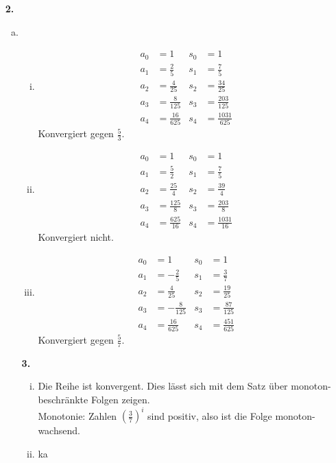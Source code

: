 \documentclass[a4paper]{scrartcl}
\begin{document}
\begin{enumerate}
\item[\textbf{2.}]
\begin{enumerate}[a)]
\item
\begin{enumerate}[(i)]
\item
\begin{align}
a_0 &= 1                & s_0 &= 1 \\
a_1 &= \frac 2 5        & s_1 &= \frac 7 5 \\
a_2 &= \frac 4 {25}     & s_2 &= \frac {34} {25} \\
a_3 &= \frac 8 {125}    & s_3 &= \frac {203} {125} \\
a_4 &= \frac {16} {625} & s_4 &= \frac {1031} {625}
\end{align}
Konvergiert gegen \(\frac 5 3\).

\item
\begin{align}
a_0 &= 1                & s_0 &= 1 \\
a_1 &= \frac 5 2        & s_1 &= \frac 7 5 \\
a_2 &= \frac {25} 4     & s_2 &= \frac {39} {4} \\
a_3 &= \frac {125} 8    & s_3 &= \frac {203} {8} \\
a_4 &= \frac {625} {16} & s_4 &= \frac {1031} {16}   
\end{align}
Konvergiert nicht.

\item
\begin{align}
a_0 &= 1                & s_0 &= 1 \\
a_1 &= -\frac 2 5       & s_1 &= \frac 3 7 \\
a_2 &= \frac 4 {25}     & s_2 &= \frac {19} {25} \\
a_3 &= -\frac 8 {125}   & s_3 &= \frac {87} {125} \\
a_4 &= \frac {16} {625} & s_4 &= \frac {451} {625}   
\end{align}
Konvergiert gegen \(\frac 5 7\).
\end{enumerate}


\item[\textbf{3.}]
\begin{enumerate}[(i)]
\item
Die Reihe ist konvergent. Dies lässt sich mit dem Satz über monoton-beschränkte Folgen zeigen.\\
Monotonie: Zahlen \((\frac 3 7)^i\) sind positiv, also ist die Folge monoton-wachsend.

\item
ka


\end{enumerate}
\end{enumerate}
\end{enumerate}
\end{document}
